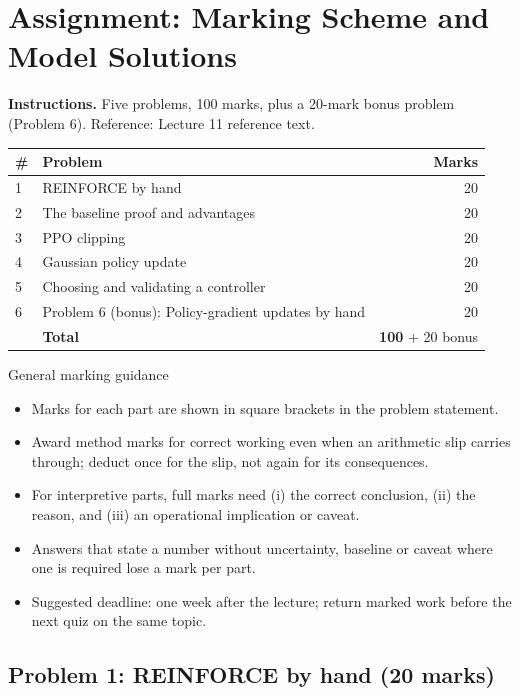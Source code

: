 \documentclass[11pt]{article}
\begin{document}
\section{Assignment: Marking Scheme and Model Solutions}

\textbf{Instructions.} Five problems, 100 marks, plus a 20-mark bonus problem (Problem 6). Reference: Lecture 11 reference text.

\begin{center}\small\renewcommand{\arraystretch}{1.25}\begin{tabularx}{0.85\textwidth}{@{}l X r@{}}\toprule\textbf{\#} & \textbf{Problem} & \textbf{Marks}\\\midrule1 & REINFORCE by hand & 20\\
2 & The baseline proof and advantages & 20\\
3 & PPO clipping & 20\\
4 & Gaussian policy update & 20\\
5 & Choosing and validating a controller & 20\\
6 & Problem 6 (bonus): Policy-gradient updates by hand & 20\\\midrule & \textbf{Total} & \textbf{100} + 20 bonus\\\bottomrule\end{tabularx}\end{center}

\begin{instr}{General marking guidance}\begin{itemize}
\item Marks for each part are shown in square brackets in the problem statement.
\item Award method marks for correct working even when an arithmetic slip carries through; deduct once for the slip, not again for its consequences.
\item For interpretive parts, full marks need (i) the correct conclusion, (ii) the reason, and (iii) an operational implication or caveat.
\item Answers that state a number without uncertainty, baseline or caveat where one is required lose a mark per part.
\item Suggested deadline: one week after the lecture; return marked work before the next quiz on the same topic.
\end{itemize}\end{instr}

\subsection{Problem 1: REINFORCE by hand \normalfont\small\color{GreyN}(20 marks)}
\end{document}
